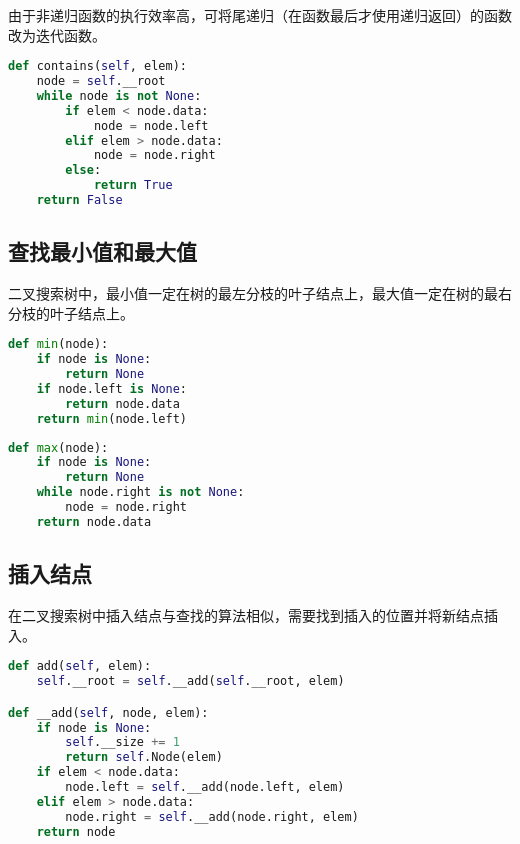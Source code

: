 由于非递归函数的执行效率高，可将尾递归（在函数最后才使用递归返回）的函数改为迭代函数。\\


\begin{lstlisting}[language=Python]
def contains(self, elem):
	node = self.__root
	while node is not None:
		if elem < node.data:
			node = node.left
		elif elem > node.data:
			node = node.right
		else:
			return True
	return False
\end{lstlisting}

\vspace{0.5cm}

\subsection{查找最小值和最大值}

二叉搜索树中，最小值一定在树的最左分枝的叶子结点上，最大值一定在树的最右分枝的叶子结点上。\\


\begin{lstlisting}[language=Python]
def min(node):
	if node is None:
		return None
	if node.left is None:
		return node.data
	return min(node.left)
\end{lstlisting}

\vspace{0.5cm}


\begin{lstlisting}[language=Python]
def max(node):
	if node is None:
		return None
	while node.right is not None:
		node = node.right
	return node.data
\end{lstlisting}

\vspace{0.5cm}

\subsection{插入结点}

在二叉搜索树中插入结点与查找的算法相似，需要找到插入的位置并将新结点插入。\\


\begin{lstlisting}[language=Python]
def add(self, elem):
	self.__root = self.__add(self.__root, elem)

def __add(self, node, elem):
	if node is None:
		self.__size += 1
		return self.Node(elem)
	if elem < node.data:
		node.left = self.__add(node.left, elem)
	elif elem > node.data:
		node.right = self.__add(node.right, elem)
	return node
\end{lstlisting}

